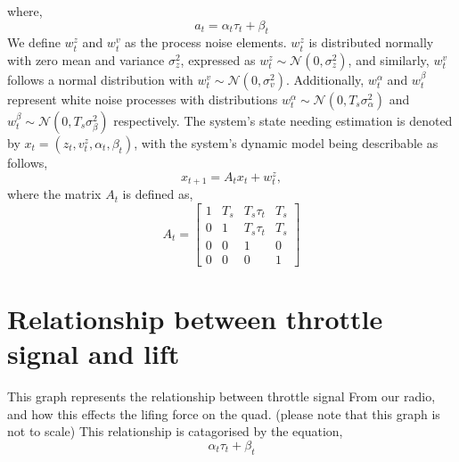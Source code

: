 \documentclass{article}
\begin{document}
where, 
\begin{equation}
    a_t =
    {\alpha_t}{\tau_t} + \beta_t
\end{equation}
We define $w_t^z$ and $w_t^v$ as the process noise elements.
$w_t^z$ is distributed normally with zero mean and variance
$\sigma_z^2$, expressed as $w_t^z \sim \mathcal{N}(0, \sigma_z^2)$, 
and similarly, $w_t^v$ follows a normal distribution with $w_t^v \sim \mathcal{N}(0, \sigma_v^2)$.
Additionally, $w_t^\alpha$ and $w_t^\beta$ represent white noise processes with distributions
$w_t^\alpha \sim \mathcal{N}(0, T_s \sigma_\alpha^2)$ and $w_t^\beta \sim \mathcal{N}(0, T_s \sigma_\beta^2)$ 
respectively. The system's state needing estimation is denoted by $x_t = (z_t, v_t^z, \alpha_t, \beta_t)$, 
with the system's dynamic model being describable as follows,
\begin{equation}
    x_{t+1} = A_t x_t + w_t^z,
\end{equation}
where the matrix $A_t$ is defined as,
\begin{equation}
    A_t = 
    \begin{bmatrix}
    1 & T_s & T_s \tau_t & T_s \\
    0 & 1 & T_s \tau_t & T_s \\
    0 & 0 & 1 & 0 \\
    0 & 0 & 0 & 1
    \end{bmatrix}
\end{equation}



\section{Relationship between throttle signal and lift}
\begin{figure}[H]
    \centering
    \label{fig:fig1}
    \caption{}
\end{figure}
This graph represents the relationship between throttle signal 
From our radio, and how this effects the lifing force on the quad.
(please note that this graph is not to scale)
This relationship is catagorised by the equation, 
\[
\alpha_t\tau_t + \beta_t
\]
\end{document}
